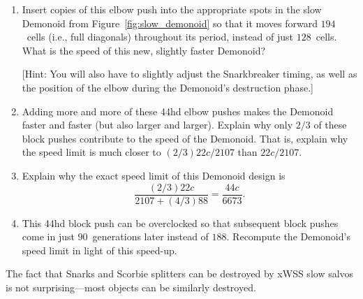 \begin{multicols}{2}
\begin{problemstar}
		\begin{center}
			\centering
		\end{center}
		
		\begin{enumerate}[label=\bf\color{ocre}(\alph*)]
			\item Insert copies of this elbow push into the appropriate spots in the slow Demonoid from Figure~\ref{fig:slow_demonoid} so that it moves forward $194$~cells (i.e., full diagonals) throughout its period, instead of just $128$~cells. What is the speed of this new, slightly faster Demonoid?
			
			[Hint: You will also have to slightly adjust the Snarkbreaker timing, as well as the position of the elbow during the Demonoid's destruction phase.]
			
			\item Adding more and more of these 44hd elbow pushes makes the Demonoid faster and faster (but also larger and larger). Explain why only $2/3$ of these block pushes contribute to the speed of the Demonoid. That is, explain why the speed limit is much closer to $(2/3)22c/2107$ than $22c/2107$.
			
			\item Explain why the exact speed limit of this Demonoid design is
			\[
			\frac{(2/3)22c}{2107 + (4/3)88} = \frac{44c}{6673}.
			\]
			
			
			\item This 44hd block push can be overclocked so that subsequent block pushes come in just $90$~generations later instead of $188$. Recompute the Demonoid's speed limit in light of this speed-up.
		\end{enumerate}
	\end{problemstar}


	\mfilbreak
	
	
	\begin{problem}\label{exer:syringe_xwss_destroy} 
		The fact that Snarks and Scorbie splitters can be destroyed by xWSS slow salvos is not surprising---most objects can be similarly destroyed.\smallskip
		

\end{problem}
\end{multicols}
